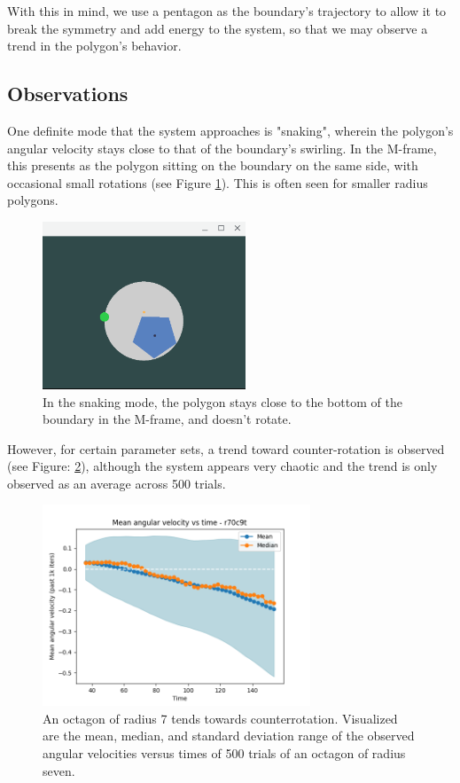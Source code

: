 \documentclass{article}
\begin{document}
With this in mind, we use a pentagon as the boundary's trajectory to allow it to break the symmetry and add energy to the system, so that we may observe a trend in the polygon's behavior. 
\subsection*{Observations}
One definite mode that the system approaches is "snaking", wherein the polygon's angular velocity stays close to that of the boundary's swirling. In the M-frame, this presents as the polygon sitting on the boundary on the same side, with occasional small rotations (see Figure \ref{fig:snaking}). This is often seen for smaller radius polygons. \\
\begin{figure}
    \centering
\includegraphics[height=5cm]{snaking.png}    \caption{In the snaking mode, the polygon stays close to the bottom of the boundary in the M-frame, and doesn't rotate.}
    \label{fig:snaking}
\end{figure}
However, for certain parameter sets, a trend toward counter-rotation is observed (see Figure: \ref{fig:down}), although the system appears very chaotic and the trend is only observed as an average across 500 trials. 
\begin{figure}
    \centering
\includegraphics[height=6cm]{down.png}
   \caption{An octagon of radius 7 tends towards counterrotation. Visualized are the mean, median, and standard deviation range of the observed angular velocities versus times of 500 trials of an octagon of radius seven. }
    \label{fig:down}
\end{figure}
\end{document}
